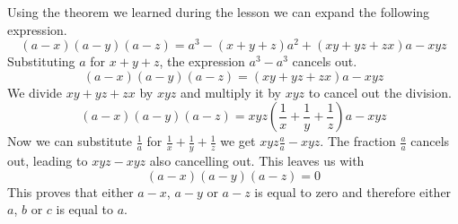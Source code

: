 \documentclass{article}
\begin{document}
Using the theorem we learned during the lesson we can expand the following expression.
\[(a-x)(a-y)(a-z) = a^3 - (x + y + z)a^2 + (xy + yz + zx)a - xyz\]
Substituting $a$ for $ x + y + z $, the expression $a^3 - a^3$ cancels out.
\[(a-x)(a-y)(a-z) = (xy + yz + zx)a - xyz\]
We divide $xy + yz + zx$ by $xyz$ and multiply it by $xyz$ to cancel out the division.
\[(a-x)(a-y)(a-z) = xyz\left(\frac{1}{x} + \frac{1}{y} + \frac{1}{z}\right)a - xyz\]
Now we can substitute $ \frac{1}{a} $ for $ \frac{1}{x} + \frac{1}{y} + \frac{1}{z} $ we get $ xyz\frac{a}{a} - xyz $. The fraction $ \frac{a}{a} $ cancels out, leading to $xyz - xyz$ also cancelling out.
This leaves us with
\[(a-x)(a-y)(a-z) = 0\]
This proves that either $a - x$, $a - y$ or $a - z$ is equal to zero and therefore either $a$, $b$ or $c$ is equal to $a$.
\end{document}
